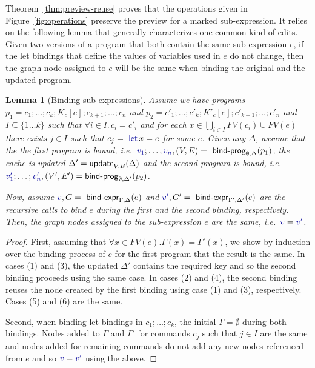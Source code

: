 \documentclass[english,submission]{programming}
\newcounter{thc}
\theoremstyle{plain}
\newtheorem{lem}[thc]{Lemma}
\theoremstyle{definition}
\newcommand{\ident}[1]{\textnormal{\textcolor{idclr}{\sffamily #1}}}
\newcommand{\kvd}[1]{\textnormal{\textcolor{kvdclr}{\sffamily #1}}}
\newcommand{\bndclr}[1]{\textcolor{kvdclr}{#1}}
\begin{document}
Theorem~\ref{thm:preview-reuse} proves that the operations given in Figure~\ref{fig:operations}
preserve the preview for a marked sub-expression. It relies on the following lemma that
generally characterizes one common kind of edits. Given two versions of a program
that both contain the same sub-expression $e$, if the let bindings that define the values of
variables used in $e$ do not change, then the graph node assigned to $e$ will be the same
when binding the original and the updated program.


\begin{lem}[Binding sub-expressions]
\label{thm:sub-expr}
Assume we have programs $p_1 = c_1; \ldots; c_k; K_c[e]; c_{k+1};\ldots; c_n$ and
$p_2 = c'_1; \ldots; c'_k; K'_c[e]; c'_{k+1};\ldots;c'_n$ and $I\subseteq \{1\ldots k\}$ such
that $\forall i\!\in\!I.\,c_i\!=\!c'_i$ and for each $x \in \bigcup_{i\in I}FV(c_i) \cup FV(e)$
there exists $j\in I$ such that $c_j = \kvd{let}\,x=e$ for some $e$.
%
Given any $\Delta$, assume that the the first program is bound,
i.e.~$\bndclr{v_1};\ldots;\bndclr{v_n}, (V, E) = \ident{bind-prog}_{\emptyset, \Delta}(p_1)$,
the cache is updated $\Delta' = \ident{update}_{V, E}(\Delta)$ and the second
program is bound,
i.e.~$\bndclr{v'_1};\ldots;\bndclr{v'_n}, (V', E') = \ident{bind-prog}_{\emptyset, \Delta'}(p_2)$.

Now, assume $\bndclr{v}, G = \ident{bind-expr}_{\Gamma, \Delta}(e)$ and
$\bndclr{v'}, G' = \ident{bind-expr}_{\Gamma', \Delta'}(e)$ are the recursive calls to bind
$e$ during the first and the second binding, respectively. Then, the graph nodes assigned to the
sub-expression $e$ are the same, i.e.~$\bndclr{v} = \bndclr{v'}$.
\end{lem}
\begin{proof}
First, assuming that $\forall x\in FV(e). \Gamma(x) = \Gamma'(x)$, we show by induction over the binding process of $e$
for the first program that the result is the same. In cases (1) and (3), the updated $\Delta'$
contains the required key and so the second binding proceeds using the same case. In cases
(2) and (4), the second binding reuses the node created by the first binding using case (1) and
(3), respectively. Cases (5) and (6) are the same.

Second, when binding let bindings in $c_1; \ldots; c_k$, the initial $\Gamma = \emptyset$ during
both bindings. Nodes added to $\Gamma$ and $\Gamma'$ for commands $c_j$ such that $j\in I$ are
the same and nodes added for remaining commands do not add any new nodes referenced from $e$ and
so $\bndclr{v} = \bndclr{v'}$ using the above.
\end{proof}
\end{document}
